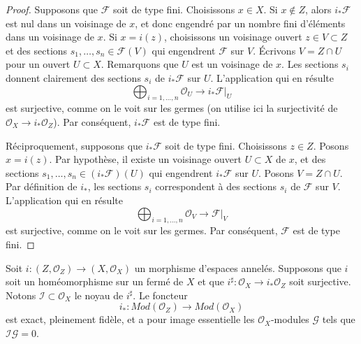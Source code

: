 \begin{proof}
Supposons que $\mathcal{F}$ soit de type fini.
Choisissons $x \in X$. Si $x \not \in Z$, alors $i_*\mathcal{F}$
est nul dans un voisinage de $x$, et donc engendré par un nombre fini d'éléments dans
un voisinage de $x$. Si $x = i(z)$, choisissons un voisinage ouvert
$z \in V \subset Z$ et des sections $s_1, \ldots, s_n \in \mathcal{F}(V)$
qui engendrent $\mathcal{F}$ sur $V$. Écrivons $V = Z \cap U$ pour un ouvert
$U \subset X$. Remarquons que $U$ est un voisinage de $x$. Les
sections $s_i$ donnent clairement des sections $s_i$ de $i_*\mathcal{F}$ sur $U$.
L'application qui en résulte
$$
\bigoplus\nolimits_{i = 1, \ldots, n} \mathcal{O}_U
\longrightarrow
i_*\mathcal{F}|_U
$$
est surjective, comme on le voit sur les germes
(on utilise ici la surjectivité de $\mathcal{O}_X \to i_*\mathcal{O}_Z$).
Par conséquent, $i_*\mathcal{F}$
est de type fini.

\medskip\noindent
Réciproquement, supposons que $i_*\mathcal{F}$ soit de type fini.
Choisissons $z \in Z$. Posons $x = i(z)$. Par hypothèse, il existe
un voisinage ouvert $U \subset X$ de $x$, et des sections
$s_1, \ldots, s_n \in (i_*\mathcal{F})(U)$ qui engendrent $i_*\mathcal{F}$
sur $U$. Posons $V = Z \cap U$. Par définition de $i_*$, les sections
$s_i$ correspondent à des sections $s_i$ de $\mathcal{F}$ sur $V$.
L'application qui en résulte
$$
\bigoplus\nolimits_{i = 1, \ldots, n} \mathcal{O}_V
\longrightarrow
\mathcal{F}|_V
$$
est surjective, comme on le voit sur les germes. Par conséquent,
$\mathcal{F}$ est de type fini.
\end{proof}

\begin{lemma}
\label{lemma-i-star-equivalence}
Soit $i : (Z, \mathcal{O}_Z) \to (X, \mathcal{O}_X)$ un morphisme
d'espaces annelés. Supposons que $i$ soit un homéomorphisme sur un fermé de $X$
et que $i^\sharp : \mathcal{O}_X \to i_*\mathcal{O}_Z$ soit surjective.
Notons $\mathcal{I} \subset \mathcal{O}_X$ le noyau de $i^\sharp$.
Le foncteur
$$
i_* :
\textit{Mod}(\mathcal{O}_Z)
\longrightarrow
\textit{Mod}(\mathcal{O}_X)
$$
est exact, pleinement fidèle, et a pour image essentielle les
$\mathcal{O}_X$-modules $\mathcal{G}$ tels que $\mathcal{I}\mathcal{G} = 0$.
\end{lemma}

